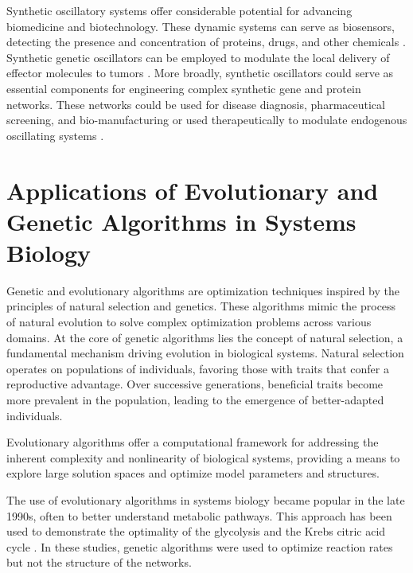 \documentclass[12pt]{report}
\begin{document}
Synthetic oscillatory systems offer considerable potential for advancing biomedicine and biotechnology. These dynamic systems can serve as biosensors, detecting the presence and concentration of proteins, drugs, and other chemicals \cite{Kis2015, CubillosRuiz2021}. Synthetic genetic oscillators can be employed to modulate the local delivery of effector molecules to tumors \cite{CubillosRuiz2021}. More broadly, synthetic oscillators could serve as essential components for engineering complex synthetic gene and protein networks. These networks could be used for disease diagnosis, pharmaceutical screening, and bio-manufacturing or used therapeutically to modulate endogenous oscillating systems \cite{Kis2015}.




\section{Applications of Evolutionary and Genetic Algorithms in Systems Biology}
\label{section:intro_GA}
Genetic and evolutionary algorithms are optimization techniques inspired by the principles of natural selection and genetics. These algorithms mimic the process of natural evolution to solve complex optimization problems across various domains. At the core of genetic algorithms lies the concept of natural selection, a fundamental mechanism driving evolution in biological systems. Natural selection operates on populations of individuals, favoring those with traits that confer a reproductive advantage. Over successive generations, beneficial traits become more prevalent in the population, leading to the emergence of better-adapted individuals.






Evolutionary algorithms offer a computational framework for addressing the inherent complexity and nonlinearity of biological systems, providing a means to explore large solution spaces and optimize model parameters and structures.



The use of evolutionary algorithms in systems biology became popular in the late 1990s, often to better understand metabolic pathways. This approach has been used to demonstrate the optimality of the glycolysis \cite{Heinrich1999, stephani1999} and the Krebs citric acid cycle \cite{mittenthal2000}. In these studies, genetic algorithms were used to optimize reaction rates but not the structure of the networks.
\end{document}
